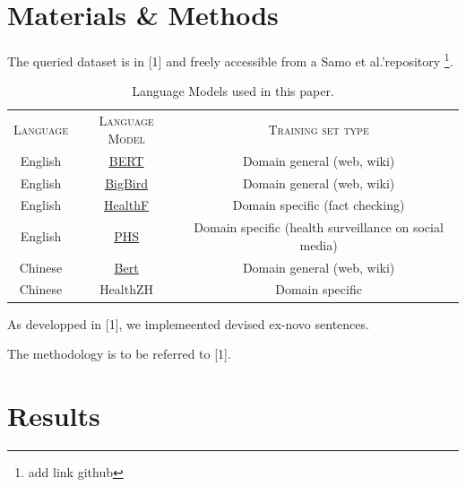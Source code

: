 \documentclass{IOS-Book-Article}
\begin{document}
\section{Materials \& Methods}

The queried dataset is in [1] and freely accessible from a Samo et al.'repository \footnote{add link github}. 

\begin{table}[]
    \centering
    \begin{tabular}{c|c|c}
         \textsc{Language} & \textsc{Language Model} & \textsc{Training set type}\\
         English & \href{https://huggingface.co/docs/transformers/model_doc/bert}{\underline{BERT}} & Domain general (web, wiki)\\
         English & \href{https://huggingface.co/docs/transformers/model_doc/big_bird}{\underline{BigBird}} & Domain general (web, wiki)\\
         English & \href{https://huggingface.co/austinmw/distilbert-base-uncased-finetuned-health_facts}{\underline{HealthF}} & Domain specific (fact checking)\\
         English & \href{https://huggingface.co/publichealthsurveillance/PHS-BERT}{\underline{PHS}} & Domain specific (health surveillance on social media)\\
         Chinese & \href{https://huggingface.co/bert-base-chinese}{\underline{Bert}} & Domain general (web, wiki)\\
         Chinese & HealthZH & Domain specific\\
         
    \end{tabular}
    \caption{Language Models used in this paper.}
    \label{tab:my_label}
\end{table}

As developped in [1], we implemeented devised ex-novo sentences. 

The methodology is to be referred to [1].

\section{Results}
\end{document}
